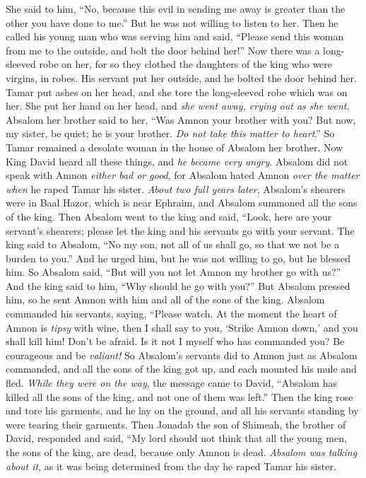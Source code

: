 \begin{biblechapter}
\verse She said to him, “No, because this evil in sending me away is greater than the other you have done to me.” But he was not willing to listen to her.
\verse Then he called his young man who was serving him and said, “Please send this woman from me to the outside, and bolt the door behind her!”
\verse Now there was a long-sleeved robe on her, for so they clothed the daughters of the king who were virgins, in robes. His servant put her outside, and he bolted the door behind her.
\verse Tamar put ashes on her head, and she tore the long-sleeved robe which was on her. She put her hand on her head, and \textit{she went away, crying out as she went}.
\verse Absalom her brother said to her, “Was Amnon your brother with you? But now, my sister, be quiet; he is your brother. \textit{Do not take this matter to heart}.” So Tamar remained a desolate woman in the house of Absalom her brother.
 Now King David heard all these things, and \textit{he became very angry}.
\verse Absalom did not speak with Amnon \textit{either bad or good}, for Absalom hated Amnon \textit{over the matter when} he raped Tamar his sister.
\verse \textit{About two full years later}, Absalom’s shearers were in Baal Hazor, which is near Ephraim, and Absalom summoned all the sons of the king.
\verse Then Absalom went to the king and said, “Look, here are your servant’s shearers; please let the king and his servants go with your servant.
\verse The king said to Absalom, “No my son, not all of us shall go, so that we not be a burden to you.” And he urged him, but he was not willing to go, but he blessed him.
\verse So Absalom said, “But will you not let Amnon my brother go with us?” And the king said to him, “Why should he go with you?”
\verse But Absalom pressed him, so he sent Amnon with him and all of the sons of the king.
\verse Absalom commanded his servants, saying, “Please watch. At the moment the heart of Amnon is \textit{tipsy} with wine, then I shall say to you, ‘Strike Amnon down,’ and you shall kill him! Don’t be afraid. Is it not I myself who has commanded you? Be courageous and be \textit{valiant!}
\verse So Absalom’s servants did to Amnon just as Absalom commanded, and all the sons of the king got up, and each mounted his mule and fled.
\verse \textit{While they were on the way}, the message came to David, “Absalom has killed all the sons of the king, and not one of them was left.”
\verse Then the king rose and tore his garments, and he lay on the ground, and all his servants standing by were tearing their garments.
\verse Then Jonadab the son of Shimeah, the brother of David, responded and said, “My lord should not think that all the young men, the sons of the king, are dead, because only Amnon is dead. \textit{Absalom was talking about it}, as it was being determined from the day he raped Tamar his sister.

\end{biblechapter}
